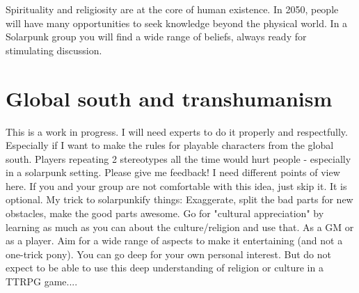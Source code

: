 Spirituality and religiosity are at the core of human existence. In 2050, people will have many opportunities to seek knowledge beyond the physical world. In a Solarpunk group you will find a wide range of beliefs, always ready for stimulating discussion.







\section{Global south and transhumanism}
\label{sec:Transhumanism}
\label{sec:Global South}

\begin{warning}
    This is a work in progress. I will need experts to do it properly and respectfully. Especially if I want to make the rules for playable characters from the global south. Players repeating 2 stereotypes all the time would hurt people - especially in a solarpunk setting.
    Please give me feedback! I need different points of view here.
    If you and your group are not comfortable with this idea, just skip it. It is optional.
    My trick to solarpunkify things: Exaggerate, split the bad parts for new obstacles, make the good parts awesome. Go for "cultural appreciation" by learning as much as you can about the culture/religion and use that. As a GM or as a player. Aim for a wide range of aspects to make it entertaining (and not a one-trick pony). You can go deep for your own personal interest. But do not expect to be able to use this deep understanding of religion or culture in a TTRPG game....
\end{warning}

